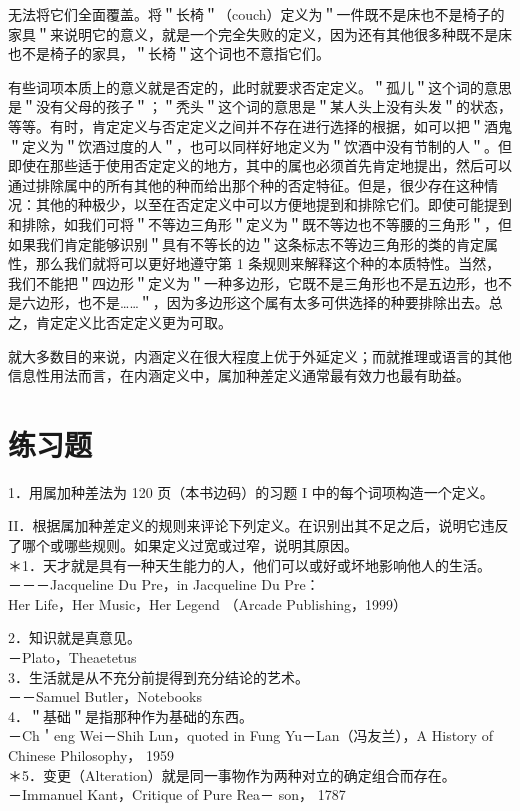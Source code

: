 无法将它们全面覆盖。将＂长椅＂（couch）定义为＂一件既不是床也不是椅子的家具＂来说明它的意义，就是一个完全失败的定义，因为还有其他很多种既不是床也不是椅子的家具，＂长椅＂这个词也不意指它们。

有些词项本质上的意义就是否定的，此时就要求否定定义。＂孤儿＂这个词的意思是＂没有父母的孩子＂；＂秃头＂这个词的意思是＂某人头上没有头发＂的状态，等等。有时，肯定定义与否定定义之间并不存在进行选择的根据，如可以把＂酒鬼＂定义为＂饮酒过度的人＂，也可以同样好地定义为＂饮酒中没有节制的人＂。但即使在那些适于使用否定定义的地方，其中的属也必须首先肯定地提出，然后可以通过排除属中的所有其他的种而给出那个种的否定特征。但是，很少存在这种情况：其他的种极少，以至在否定定义中可以方便地提到和排除它们。即使可能提到和排除，如我们可将＂不等边三角形＂定义为＂既不等边也不等腰的三角形＂，但如果我们肯定能够识别＂具有不等长的边＂这条标志不等边三角形的类的肯定属性，那么我们就将可以更好地遵守第 1 条规则来解释这个种的本质特性。当然，我们不能把＂四边形＂定义为＂一种多边形，它既不是三角形也不是五边形，也不是六边形，也不是……＂，因为多边形这个属有太多可供选择的种要排除出去。总之，肯定定义比否定定义更为可取。

就大多数目的来说，内涵定义在很大程度上优于外延定义；而就推理或语言的其他信息性用法而言，在内涵定义中，属加种差定义通常最有效力也最有助益。

\section*{练习题}
1．用属加种差法为 120 页（本书边码）的习题 I 中的每个词项构造一个定义。

II．根据属加种差定义的规则来评论下列定义。在识别出其不足之后，说明它违反了哪个或哪些规则。如果定义过宽或过窄，说明其原因。\\
＊1．天才就是具有一种天生能力的人，他们可以或好或坏地影响他人的生活。\\
－－－Jacqueline Du Pre，in Jacqueline Du Pre：\\
Her Life，Her Music，Her Legend （Arcade Publishing，1999）

2．知识就是真意见。\\
－Plato，Theaetetus\\
3．生活就是从不充分前提得到充分结论的艺术。\\
－－Samuel Butler，Notebooks\\
4．＂基础＂是指那种作为基础的东西。\\
－Ch＇eng Wei－Shih Lun，quoted in Fung Yu－Lan（冯友兰），A History of Chinese Philosophy， 1959\\
＊5．变更（Alteration）就是同一事物作为两种对立的确定组合而存在。\\
－Immanuel Kant，Critique of Pure Rea－ son， 1787

